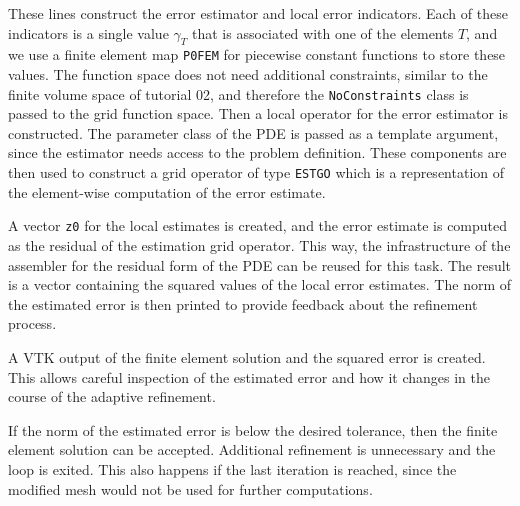 \documentclass[a4paper,12pt]{article}
\begin{document}

These lines construct the error estimator and local error indicators. Each of these
indicators is a single value $\gamma_T$ that is associated with one of the elements $T$,
and we use a finite element map \lstinline{P0FEM} for piecewise constant functions to
store these values. The function space does not need additional constraints, similar to
the finite volume space of tutorial 02, and therefore the \lstinline{NoConstraints} class
is passed to the grid function space. Then a local operator for the error estimator is
constructed. The parameter class of the PDE is passed as a template argument, since the
estimator needs access to the problem definition. These components are then used to
construct a grid operator of type \lstinline{ESTGO} which is a representation of the
element-wise computation of the error estimate.


A vector \lstinline {z0} for the local estimates is created, and the error estimate is
computed as the residual of the estimation grid operator. This way, the infrastructure of
the assembler for the residual form of the PDE can be reused for this task. The result is
a vector containing the squared values of the local error estimates. The norm of the
estimated error is then printed to provide feedback about the refinement process.


A VTK output of the finite element solution and the squared error is created. This allows
careful inspection of the estimated error and how it changes in the course of the
adaptive refinement.


If the norm of the estimated error is below the desired tolerance, then the finite element
solution can be accepted. Additional refinement is unnecessary and the loop is exited. This
also happens if the last iteration is reached, since the modified mesh would not be
used for further computations.
\end{document}

